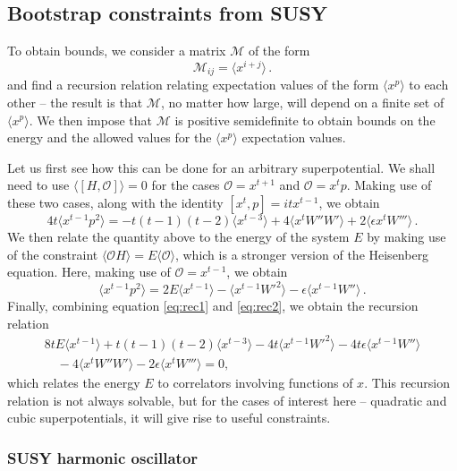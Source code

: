 \documentclass[a4paper,11pt]{article}
\def\be{\begin{equation}}
\def\ee{\end{equation}}
\numberwithin{equation}{section}
\begin{document}
\subsection{Bootstrap constraints from SUSY}
\label{sec:qm_bootstrap}

To obtain bounds, we consider a matrix $\mathcal{M}$ of the form
\be
\mathcal{M}_{ij} = \langle x^{i+j} \rangle \, .
\ee
and find a recursion relation relating expectation values of the form $\langle x^{p} \rangle$ to each other -- the result is that $\mathcal M$, no matter how large, will depend on a finite set of $\langle x^{p} \rangle$. We then impose that $\mathcal{M}$ is positive semidefinite to obtain bounds on the energy and the allowed values for the $\langle x^{p} \rangle$ expectation values.

Let us first see how this can be done for an arbitrary superpotential. We shall need to use $\langle [ H , \mathcal{O}] \rangle = 0$ for the cases $\mathcal{O} = x^{t+1}$ and $\mathcal{O} = x^t p$. Making use of these two cases, along with the identity $[x^t , p] = i t x^{t-1}$, we obtain
\be
4 t \langle x^{t-1} p^2 \rangle = - t(t-1)(t-2) \langle x^{t-3} \rangle + 4 \langle x^t W'' W' \rangle + 2 \langle \epsilon x^t W''' \rangle \, .
\label{eq:rec1}
\ee
We then relate the quantity above to the energy of the system $E$ by making use of the constraint $\langle \mathcal{O} H \rangle = E \langle \mathcal{O} \rangle$, which is a stronger version of the Heisenberg equation. Here, making use of $\mathcal{O} = x^{t-1}$, we obtain
\be
\langle x^{t-1} p^2 \rangle = 2 E \langle x^{t-1} \rangle - \langle x^{t-1} W'^2 \rangle - \epsilon \langle x^{t-1} W'' \rangle \, .
\label{eq:rec2}
\ee
Finally, combining equation \ref{eq:rec1} and \ref{eq:rec2}, we obtain the recursion relation
\begin{align}
    8 t E \langle x^{t-1} \rangle + t(t-1)(t-2) \langle x^{t-3} \rangle - 4 t \langle x^{t-1} W'^2 \rangle - 4 t \epsilon \langle x^{t-1} W'' \rangle \nonumber \\
    \quad - 4 \langle x^t W'' W' \rangle - 2 \epsilon \langle x^t W''' \rangle = 0 ,
    \label{eq:reqanyW}
\end{align}
which relates the energy $E$ to correlators involving functions of $x$. %
This recursion relation is not always solvable, but for the cases of interest here -- quadratic and cubic superpotentials, it will give rise to useful constraints.

\subsubsection{SUSY harmonic oscillator}
\end{document}

